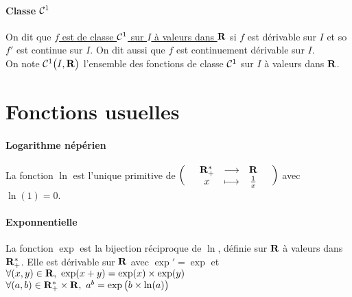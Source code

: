 		\paragraph{Classe ${\mathcal{C}}^1$}
			On dit que \underline{$f$ est de classe ${\mathcal{C}}^1$ sur $I$ à valeurs dans ${\mathbf{R}}$} si $f$ est dérivable sur $I$ et so $f'$ est continue 
			sur $I$. On dit aussi que $f$ est continuement dérivable sur $I$. \\ On note ${\mathcal{C}}^1\big(I,{\mathbf{R}}\big)$ l'ensemble des fonctions de 
			classe ${\mathcal{C}}^1$ sur $I$ à valeurs dans ${\mathbf{R}}$. \trait
	\section{Fonctions usuelles}
		\traitd
		\paragraph{Logarithme népérien}
			La fonction $\ln$ est l'unique primitive de $\left( \begin{array}{ccccc} & {\mathbf{R}}_+^* & \longrightarrow & {\mathbf{R}} & \\ & x & \longmapsto & \frac{1}{x} & \end{array} \right)$ avec $\ln(1)=0$. \trait
		\vspace*{0.5cm} \\  \traitd
		\paragraph{Exponnentielle}
			La fonction $\exp$ est la bijection réciproque de $\ln$, définie sur ${\mathbf{R}}$ à valeurs dans ${\mathbf{R}}_+^*$. Elle est dérivable sur ${\mathbf{R}}$ avec 
			$\exp'=\exp$ et $\forall (x,y)\in{\mathbf{R}} ,~\exp(x+y) = \exp(x)\times \exp(y)$ \trait 
		\vspace*{-1.1cm} \\ $\forall (a,b) \in {\mathbf{R}}_+^* \times{\mathbf{R}} ,~a^b = \exp\big(b\times\ln(a)\big)$ \newpage \traitd
